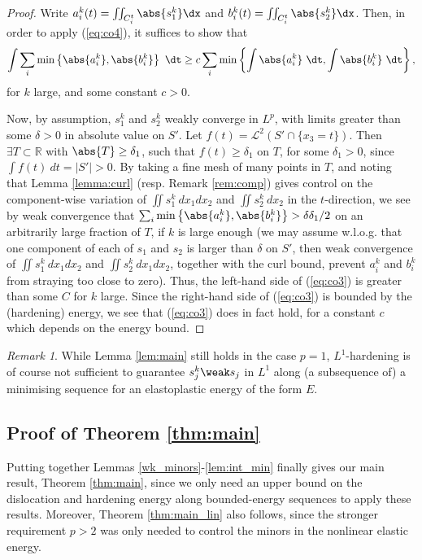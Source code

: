 \documentclass[11pt,reqno]{amsart}
\theoremstyle{plain}
\theoremstyle{definition}
\theoremstyle{remark}
\newtheorem{remark}{Remark}
\begin{document}
\begin{proof}
Write $a_i^k(t) = \iint_{C_i^t} \abs{s_1^k}\dx$ and $b_i^k(t) = \iint_{C_i^t} \abs{s_2^k}\dx$. Then, in order to apply (\ref{eq:co4}), it suffices to show that
\begin{equation} \label{eq:co3}
\int\sum_i\min\left\{\abs{a_i^k}, \abs{b_i^k}\right\}~\dt \geq c\sum_i\min\left\{\int\abs{a_i^k}~\dt, \int\abs{b_i^k}~\dt\right\},
\end{equation}
for $k$ large, and some constant $c>0$.

Now, by assumption, $s_1^k$ and $s_2^k$ weakly converge in $L^p$, with limits greater than some $\delta>0$ in absolute value on $S'$. Let $f(t) = \mathcal{L}^2(S'\cap\{x_3 = t\})$. Then $\exists T\subset\mathbb{R}$ with $\abs{T}\geq\delta_1$, such that $f(t)\geq\delta_1$ on $T$, for some $\delta_1>0$, since $\int f(t)~dt = |S'|>0$. By taking a fine mesh of many points in $T$, and noting that Lemma \ref{lemma:curl} (resp. Remark \ref{rem:comp}) gives control on the component-wise variation of $\iint s_1^k~dx_1dx_2$ and $\iint s_2^k~dx_2$ in the $t$-direction, we see by weak convergence that $\sum_i\min\left\{\abs{a_i^k}, \abs{b_i^k}\right\}>\delta\delta_1/2$ on an arbitrarily large fraction of $T$, if $k$ is large enough (we may assume w.l.o.g. that one component of each of $s_1$ and $s_2$ is larger than $\delta$ on $S'$, then weak convergence of  $\iint s_1^k~dx_1dx_2$ and $\iint s_2^k~dx_1dx_2$, together with the curl bound, prevent $a_i^k$ and $b_i^k$ from straying too close to zero). Thus, the left-hand side of (\ref{eq:co3}) is greater than some $C$ for $k$ large. Since the right-hand side of (\ref{eq:co3}) is bounded by the (hardening) energy, we see that (\ref{eq:co3}) does in fact hold, for a constant $c$ which depends on the energy bound.
\end{proof}

\begin{remark}
While Lemma \ref{lem:main} still holds in the case $p=1$, $L^1$-hardening is of course not sufficient to guarantee $s_j^k \weak s_j$ in $L^1$ along (a subsequence of) a minimising sequence for an elastoplastic energy of the form $E$. 
\end{remark}

\subsection{Proof of Theorem \ref{thm:main}} Putting together Lemmas \ref{wk_minors}-\ref{lem:int_min} finally gives our main result, Theorem \ref{thm:main}, since we only need an upper bound on the dislocation and hardening energy along bounded-energy sequences to apply these results. Moreover, Theorem \ref{thm:main_lin} also follows, since the stronger requirement $p>2$ was only needed to control the minors in the nonlinear elastic energy. 
\end{document}
